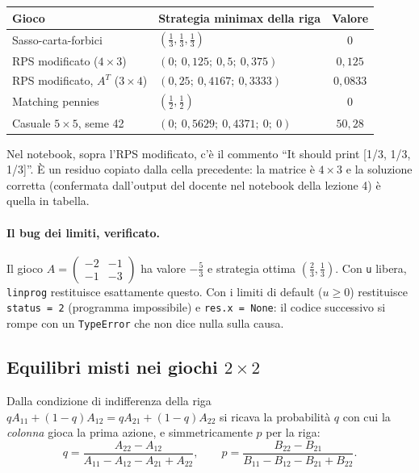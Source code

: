 \begin{center}
\renewcommand{\arraystretch}{1.2}
\small
\begin{tabular}{llc}
\toprule
Gioco & Strategia minimax della riga & Valore \\
\midrule
Sasso-carta-forbici & $(\frac13, \frac13, \frac13)$ & $0$ \\
RPS modificato ($4\times3$) & $(0;\ 0{,}125;\ 0{,}5;\ 0{,}375)$ & $0{,}125$ \\
RPS modificato, $A^T$ ($3\times4$) & $(0{,}25;\ 0{,}4167;\ 0{,}3333)$ & $0{,}0833$ \\
Matching pennies & $(\frac12, \frac12)$ & $0$ \\
Casuale $5\times5$, seme 42 & $(0;\ 0{,}5629;\ 0{,}4371;\ 0;\ 0)$ & $50{,}28$ \\
\bottomrule
\end{tabular}
\end{center}

\begin{attenzione}
Nel notebook, sopra l'RPS modificato, c'è il commento ``It should print [1/3, 1/3, 1/3]''.
È un residuo copiato dalla cella precedente: la matrice è $4\times3$ e la soluzione corretta
(confermata dall'output del docente nel notebook della lezione 4) è quella in tabella.
\end{attenzione}

\paragraph{Il bug dei limiti, verificato.}
Il gioco $A = \begin{pmatrix} -2 & -1 \\ -1 & -3 \end{pmatrix}$ ha valore
$-\tfrac53$ e strategia ottima $(\tfrac23, \tfrac13)$. Con \texttt{u} libera,
\texttt{linprog} restituisce esattamente questo. Con i limiti di default ($u \ge 0$)
restituisce \texttt{status = 2} (programma impossibile) e \texttt{res.x = None}: il codice
successivo si rompe con un \texttt{TypeError} che non dice nulla sulla causa.

\subsection{Equilibri misti nei giochi \texorpdfstring{$2\times2$}{2x2}}

Dalla condizione di indifferenza della riga
$qA_{11} + (1-q)A_{12} = qA_{21} + (1-q)A_{22}$ si ricava la probabilità $q$ con cui la
\emph{colonna} gioca la prima azione, e simmetricamente $p$ per la riga:
\[
  q = \frac{A_{22} - A_{12}}{A_{11} - A_{12} - A_{21} + A_{22}},
  \qquad
  p = \frac{B_{22} - B_{21}}{B_{11} - B_{12} - B_{21} + B_{22}} .
\]


